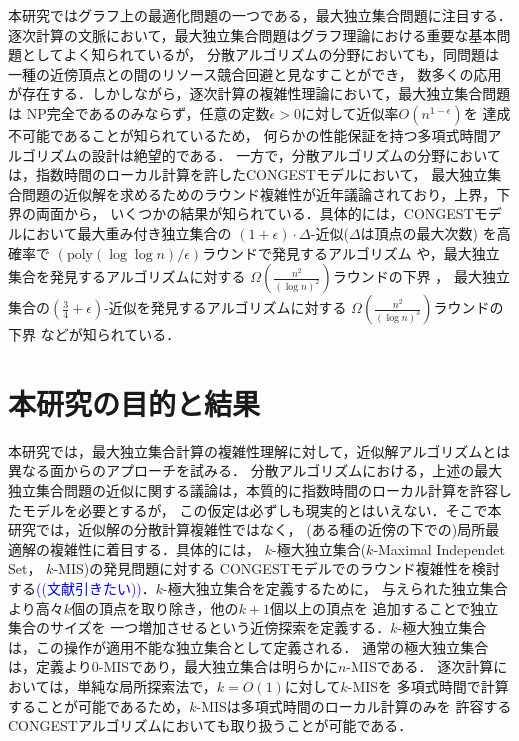 \documentclass[12pt]{thesis}
\newcommand{\Izumi}[1]{\textcolor{blue}{(#1)}}
\newcommand{\CONGEST}{\textsf{CONGEST}}
\theoremstyle{definition}
\begin{document}
本研究ではグラフ上の最適化問題の一つである，最大独立集合問題に注目する．
逐次計算の文脈において，最大独立集合問題はグラフ理論における重要な基本問題としてよく知られているが，
分散アルゴリズムの分野においても，同問題は一種の近傍頂点との間のリソース競合回避と見なすことができ，
数多くの応用が存在する．しかしながら，逐次計算の複雑性理論において，最大独立集合問題は
NP完全であるのみならず，任意の定数$\epsilon > 0$に対して近似率$O(n^{1-\epsilon})$を
達成不可能であることが知られているため，
何らかの性能保証を持つ多項式時間アルゴリズムの設計は絶望的である\cite{haastad1999clique}．
一方で，分散アルゴリズムの分野においては，指数時間のローカル計算を許した{\CONGEST}モデルにおいて，
最大独立集合問題の近似解を求めるためのラウンド複雑性が近年議論されており，上界，下界の両面から，
いくつかの結果が知られている．具体的には，{\CONGEST}モデルにおいて最大重み付き独立集合の
$(1 + \epsilon) \cdot \Delta$-近似($\Delta$は頂点の最大次数) を高確率で
$\left(\mathrm{poly}(\log \log n)/\epsilon \right)$ラウンドで発見するアルゴリズム
\cite{kawarabayashi2019improved} や，最大独立集合を発見するアルゴリズムに対する
$\Omega \left(\frac{n^{2}}{(\log n)^{2}}\right)$ラウンドの下界 \cite{censor2017quadratic}，
最大独立集合の$(\frac{3}{4} + \epsilon)$-近似を発見するアルゴリズムに対する
$\Omega \left(\frac{n^{2}}{(\log n)^{3}}\right)$ラウンドの下界 \cite{efron2020beyond} などが知られている．

\section{本研究の目的と結果}
本研究では，最大独立集合計算の複雑性理解に対して，近似解アルゴリズムとは異なる面からのアプローチを試みる．
分散アルゴリズムにおける，上述の最大独立集合問題の近似に関する議論は，本質的に指数時間のローカル計算を許容したモデルを必要とするが，
この仮定は必ずしも現実的とはいえない．そこで本研究では，近似解の分散計算複雑性ではなく，
(ある種の近傍の下での)局所最適解の複雑性に着目する．具体的には，
$k$-極大独立集合($k$-Maximal Independet Set， $k$-MIS)の発見問題に対する
{\CONGEST}モデルでのラウンド複雑性を検討する\cite{bollobas1991generalised}\Izumi{(文献引きたい)}．$k$-極大独立集合を定義するために，
与えられた独立集合より高々$k$個の頂点を取り除き，他の$k+1$個以上の頂点を
追加することで独立集合のサイズを
一つ増加させるという近傍探索を定義する．$k$-極大独立集合は，この操作が適用不能な独立集合として定義される．
通常の極大独立集合は，定義より$0$-MISであり，最大独立集合は明らかに$n$-MISである．
逐次計算においては，単純な局所探索法で，$k=O(1)$に対して$k$-MISを
多項式時間で計算することが可能であるため，$k$-MISは多項式時間のローカル計算のみを
許容する{\CONGEST}アルゴリズムにおいても取り扱うことが可能である．
\end{document}
